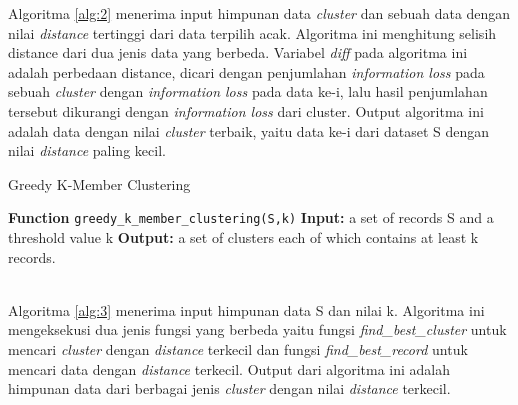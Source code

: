 \documentclass[a4paper,twoside]{article}
\begin{document}
\begin{enumerate}
Algoritma \ref{alg:2} menerima input himpunan data \textit{cluster} dan sebuah data dengan nilai \textit{distance} tertinggi dari data terpilih acak. Algoritma ini menghitung selisih distance dari dua jenis data yang berbeda. Variabel \textit{diff} pada algoritma ini adalah perbedaan distance, dicari dengan penjumlahan \textit{information loss} pada sebuah \textit{cluster} dengan \textit{information loss} pada data ke-i, lalu hasil penjumlahan tersebut dikurangi dengan \textit{information loss} dari {cluster}. Output algoritma ini adalah data dengan nilai \textit{cluster} terbaik, yaitu data ke-i dari dataset S dengan nilai \textit{distance} paling kecil.
\begin{tcolorbox}[blanker,width=(\linewidth-0.5cm)]
\begin{algorithm}[H]
  \caption{Greedy K-Member Clustering}		 \label{alg:3}
  \begin{algorithmic}[1]
  \State \textbf{Function} \texttt{greedy\_k\_member\_clustering(S,k)}
  \State \textbf{Input:} a set of records S and a threshold value k
  \State \textbf{Output:} a set of clusters each of which contains at least k records.
  \\
  \EndIf
  \\
  	\EndWhile
  \EndWhile
  \EndWhile
  \end{algorithmic}
\end{algorithm}
\end{tcolorbox}

Algoritma \ref{alg:3} menerima input himpunan data S dan nilai k. Algoritma ini mengeksekusi dua jenis fungsi yang berbeda yaitu fungsi \textit{find\_best\_cluster} untuk mencari \textit{cluster} dengan \textit{distance} terkecil dan fungsi \textit{find\_best\_record} untuk mencari data dengan \textit{distance} terkecil. Output dari algoritma ini adalah himpunan data dari berbagai jenis \textit{cluster} dengan nilai \textit{distance} terkecil.
		

\end{enumerate}
\end{document}
